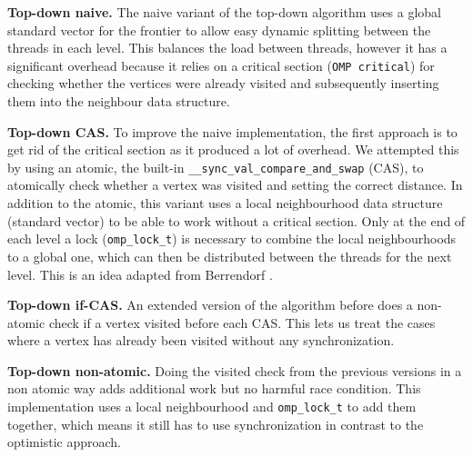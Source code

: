 \documentclass[letterpaper]{article}
\newcommand{\mypar}[1]{{\bf #1.}} %
\begin{document}
		\mypar{Top-down naive}
		The naive variant of the top-down algorithm uses a global standard vector for the frontier to allow easy dynamic splitting between the threads in each level. 
		This balances the load between threads, however it has a significant overhead because it relies on a critical section (\verb+OMP critical+) for checking whether the vertices were already visited and subsequently inserting them into the neighbour data structure.

		\mypar{Top-down CAS}
		To improve the naive implementation, the first approach is to get rid of the critical section as it produced a lot of overhead. 
		We attempted this by using an atomic, the built-in \verb+__sync_val_compare_and_swap+ (CAS), to atomically check whether a vertex was visited and setting the correct distance. 
		In addition to the atomic, this variant uses a local neighbourhood data structure (standard vector) to be able to work without a critical section. 
		Only at the end of each level a lock (\verb+omp_lock_t+) is necessary to combine the local neighbourhoods to a global one, which can then be distributed between the threads for the next level. 
		This is an idea adapted from Berrendorf \cite{Berrendorf:14}.
		
		\mypar{Top-down if-CAS}
		An extended version of the algorithm before does a non-atomic check if a vertex visited before each CAS. 
		This lets us treat the cases where a vertex has already been visited without any synchronization.

		\mypar{Top-down non-atomic}
		Doing the visited check from the previous versions in a non atomic way adds additional work but no harmful race condition.
		This implementation uses a local neighbourhood and \verb+omp_lock_t+ to add them together, which means it still has to use synchronization in contrast to the optimistic approach.
\end{document}
